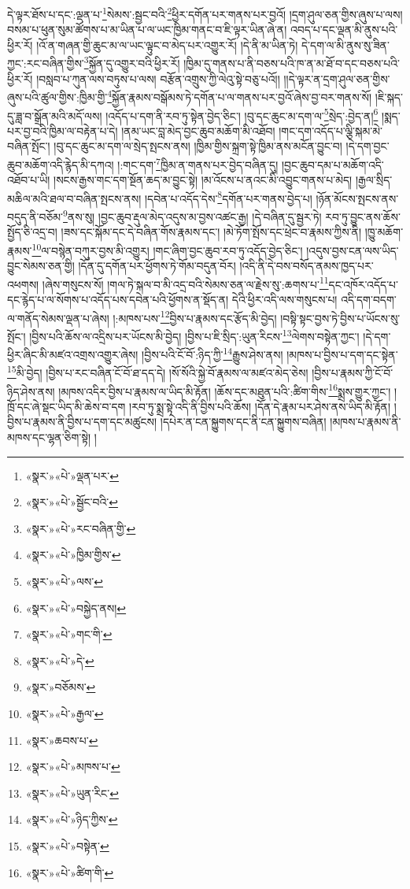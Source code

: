དེ་ལྟར་ཐོས་པ་དང་:ལྡན་པ་\footnote{«སྣར་»«པེ་»ལྡན་པར་}སེམས་:སྦྱང་བའི་\footnote{«སྣར་»«པེ་»སྦྱོང་བའི་}ཕྱིར་དགོན་པར་གནས་པར་བྱའོ། །དྲག་ཤུལ་ཅན་གྱིས་ཞུས་པ་ལས། བསམ་པ་ཕུན་སུམ་ཚོགས་པ་མ་ཡིན་པ་ལ་ཡང་ཁྱིམ་གནང་བ་ཇི་ལྟར་ཡིན་ཞེ་ན། འབད་པ་དང་ལྡན་མི་ནུས་པའི་ཕྱིར་རོ། །འོ་ན་གཞན་གྱི་ཆུང་མ་ལ་ཡང་ལྟུང་བ་མེད་པར་འགྱུར་རོ། །དེ་ནི་མ་ཡིན་ཏེ། དེ་དག་ལ་མི་ནུས་སུ་ཟིན་ཀྱང་:རང་བཞིན་གྱིས་\footnote{«སྣར་»«པེ་»རང་བཞིན་གྱི་}སྐྱོན་དུ་འགྱུར་བའི་ཕྱིར་རོ། །ཁྱིམ་དུ་གནས་པ་ནི་བཅས་པའི་ཁ་ན་མ་ཐོ་བ་དང་བཅས་པའི་ཕྱིར་རོ། །བསླབ་པ་ཀུན་ལས་བཏུས་པ་ལས། བརྩོན་འགྲུས་ཀྱི་ལེའུ་སྟེ་བཅུ་པའོ།། །།དེ་ལྟར་ན་དྲག་ཤུལ་ཅན་གྱིས་ཞུས་པའི་ཚུལ་གྱིས་:ཁྱིམ་གྱི་\footnote{«སྣར་»«པེ་»ཁྱིམ་གྱིས་}སྐྱོན་རྣམས་བསྒོམས་ཏེ་དགོན་པ་ལ་གནས་པར་བྱའོ་ཞེས་བྱ་བར་གནས་སོ། །ཇི་སྐད་དུ་ཟླ་བ་སྒྲོན་མའི་མདོ་ལས། །འདོད་པ་དག་ནི་རབ་ཏུ་སྟེན་བྱེད་ཅིང་། །བུ་དང་ཆུང་མ་དག་ལ་\footnote{«སྣར་»«པེ་»ལས་}སྲེད་:བྱེད་ན།\footnote{«སྣར་»«པེ་»བསྐྱེད་ནས།} །སྨད་པར་བྱ་བའི་ཁྱིམ་ལ་བརྟེན་པ་དེ། །ནམ་ཡང་བླ་མེད་བྱང་ཆུབ་མཆོག་མི་འཐོབ། །གང་དག་འདོད་པ་ལྕི་སྐམ་མེ་བཞིན་སྤོང་། །བུ་དང་ཆུང་མ་དག་ལ་སྲེད་སྤངས་ནས། །ཁྱིམ་གྱིས་སྐྲག་སྟེ་ཁྱིམ་ནས་མངོན་བྱུང་བ། །དེ་དག་བྱང་ཆུབ་མཆོག་འདི་རྙེད་མི་དཀའ། །:གང་དག་\footnote{«སྣར་»«པེ་»གང་གི་}ཁྱིམ་ན་གནས་པར་བྱེད་བཞིན་དུ། །བྱང་ཆུབ་དམ་པ་མཆོག་འདི་འཐོབ་པ་ཡི། །སངས་རྒྱས་གང་དག་སྔོན་ཆད་མ་བྱུང་སྟེ། །མ་འོངས་པ་ནའང་མི་འབྱུང་གནས་པ་མེད། །རྒྱལ་སྲིད་མཆིལ་མའི་ཐལ་བ་བཞིན་སྤངས་ནས། །དབེན་པ་འདོད་དེས་\footnote{«སྣར་»«པེ་»དེ་}དགོན་པར་གནས་བྱེད་པ། །ཉོན་མོངས་སྤངས་ནས་བདུད་ནི་བཅོམ་\footnote{«སྣར་»བཅོམས་}ནས་སུ། །བྱང་ཆུབ་རྡུལ་མེད་འདུས་མ་བྱས་འཚང་རྒྱ། །དེ་བཞིན་དུ་སྦྱར་ཏེ། རབ་ཏུ་བྱུང་ནས་ཆོས་སྤྱོད་ཅི་འདྲ་བ། །ཟས་དང་སྐོམ་དང་དེ་བཞིན་གོས་རྣམས་དང་། །མེ་ཏོག་སྤོས་དང་ཕྲེང་བ་རྣམས་ཀྱིས་ནི། །ཁྱུ་མཆོག་རྣམས་\footnote{«སྣར་»«པེ་»རྒྱལ་}ལ་བསྙེན་བཀུར་བྱས་མི་འགྱུར། །གང་ཞིག་བྱང་ཆུབ་རབ་ཏུ་འདོད་བྱེད་ཅིང་། །འདུས་བྱས་ངན་ལས་ཡིད་བྱུང་སེམས་ཅན་གྱི། །དོན་དུ་དགོན་པར་ཕྱོགས་ཏེ་གོམ་བདུན་བོར། །འདི་ནི་དེ་བས་བསོད་ནམས་ཁྱད་པར་འཕགས། །ཞེས་གསུངས་སོ། །གལ་ཏེ་སྐལ་བ་མི་འདྲ་བའི་སེམས་ཅན་ལ་རྗེས་སུ་:ཆགས་པ་\footnote{«སྣར་»ཆབས་པ་}དང་འཁོར་འདོད་པ་དང་རྙེད་པ་ལ་སོགས་པ་འདོད་པས་དབེན་པའི་ཕྱོགས་ན་སྡོད་ན། དེའི་ཕྱིར་འདི་ལས་གསུངས་པ། འདི་དག་བདག་ལ་གནོད་སེམས་ལྡན་པ་ཞེས། །:མཁས་པས་\footnote{«སྣར་»«པེ་»མཁས་པ་}བྱིས་པ་རྣམས་དང་རྩོད་མི་བྱེད། །བསྟི་སྟང་བྱས་ཏེ་བྱིས་པ་ཡོངས་སུ་སྤོང་། །བྱིས་པའི་ཆོས་ལ་འདྲིས་པར་ཡོངས་མི་བྱེད། །བྱིས་པ་ཇི་སྲིད་:ཡུན་རིངས་\footnote{«སྣར་»«པེ་»ཡུན་རིང་}ལེགས་བསྟེན་ཀྱང་། །དེ་དག་ཕྱིར་ཞིང་མི་མཛའ་འགྲས་འགྱུར་ཞེས། །བྱིས་པའི་ངོ་བོ་:ཉིད་ཀྱི་\footnote{«སྣར་»«པེ་»ཉིད་ཀྱིས་}རྒྱུས་ཤེས་ནས། །མཁས་པ་བྱིས་པ་དག་དང་སྟེན་\footnote{«སྣར་»«པེ་»བསྟེན་}མི་བྱེད། །བྱིས་པ་རང་བཞིན་ངོ་བོ་ཐ་དད་དེ། །སོ་སོའི་སྐྱེ་བོ་རྣམས་ལ་མཛའ་མེད་ཅེས། །བྱིས་པ་རྣམས་ཀྱི་ངོ་བོ་ཉིད་ཤེས་ནས། །མཁས་འདིར་བྱིས་པ་རྣམས་ལ་ཡིད་མི་རྟོན། །ཆོས་དང་མཐུན་པའི་:ཚིག་གིས་\footnote{«སྣར་»«པེ་»ཚིག་གི་}སྨྲས་གྱུར་ཀྱང་། །ཁྲོ་དང་ཞེ་སྡང་ཡིད་མི་ཆེས་བ་དག །རབ་ཏུ་སྨྲ་སྟེ་འདི་ནི་བྱིས་པའི་ཆོས། །དོན་དེ་རྣམ་པར་ཤེས་ནས་ཡིད་མི་རྟོན། །བྱིས་པ་རྣམས་ནི་བྱིས་པ་དག་དང་མཚུངས། །དཔེར་ན་ངན་སྐྱུགས་དང་ནི་ངན་སྐྱུགས་བཞིན། །མཁས་པ་རྣམས་ནི་མཁས་དང་ལྷན་ཅིག་སྟེ། །
